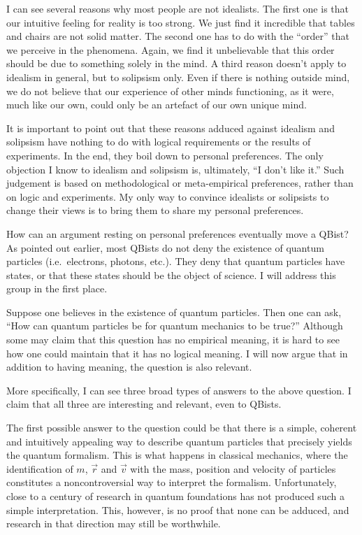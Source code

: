 \documentclass[12pt]{article}
\begin{document}
I can see several reasons why most people
are not idealists.  The first one is
that our intuitive feeling for reality
is too strong.  We just find it incredible
that tables and chairs are not solid
matter.  The second one has to do with
the ``order'' that we perceive in the
phenomena.  Again, we find it unbelievable
that this order should be due to something
solely in the mind.  A third reason doesn't
apply to idealism in general, but to
solipsism only.  Even if there is nothing
outside mind, we do not believe that our
experience of other minds functioning, as
it were, much like our own, could only be an
artefact of our own unique mind.

It is important to point out that
these reasons adduced against idealism
and solipsism have nothing to do
with logical requirements or the
results of experiments.  In the end,
they boil down to personal preferences.
The only objection I know to idealism
and solipsism is, ultimately,
``I don't like it.''  Such judgement is
based on methodological or meta-empirical
preferences, rather than on logic and
experiments.  My only way to convince
idealists or solipsists to change their
views is to bring them to share my
personal preferences.

How can an argument resting on personal
preferences eventually move a QBist?
As pointed out earlier, most QBists do
not deny the existence of quantum
particles (i.e.\ electrons, photons, etc.).
They deny that quantum particles have states,
or that these states should be the object
of science.  I will address this group in
the first place.

Suppose one believes in the existence
of quantum particles.  Then one can ask,
``How can quantum particles be for
quantum mechanics to be true?''  Although
some may claim that this question has no
empirical meaning, it is hard to see how one
could maintain that it has no logical meaning.
I will now argue that in addition to having
meaning, the question is also relevant.

More specifically, I can see three broad
types of answers to the above question.
I claim that all three are interesting and
relevant, even to QBists.

The first possible answer to the question
could be that there is a simple,
coherent and intuitively appealing
way to describe quantum particles
that precisely yields the quantum
formalism.  This is what happens in
classical mechanics, where the
identification of $m$, $\vec{r}$
and $\vec{v}$ with the mass, position
and velocity of particles constitutes a
noncontroversial way to interpret the
formalism.  Unfortunately, close to a
century of research in quantum foundations
has not produced such a simple
interpretation.  This, however, is no
proof that none can be adduced, and
research in that direction may still be
worthwhile.
\end{document}
